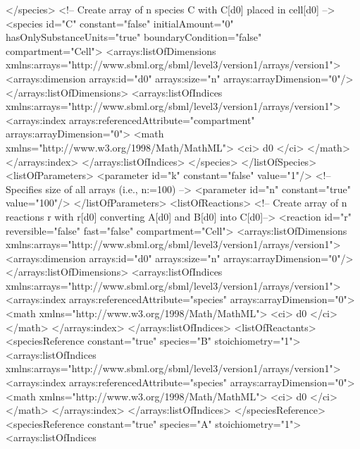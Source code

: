 \begin{example}
    </species>
    <!-- Create array of n species C with C[d0] placed in cell[d0] -->
    <species id="C" constant="false" initialAmount="0" hasOnlySubstanceUnits="true" 
	boundaryCondition="false" compartment="Cell">
        <arrays:listOfDimensions
            xmlns:arrays="http://www.sbml.org/sbml/level3/version1/arrays/version1">
            <arrays:dimension arrays:id="d0" arrays:size="n" arrays:arrayDimension="0"/>
        </arrays:listOfDimensions>
        <arrays:listOfIndices
            xmlns:arrays="http://www.sbml.org/sbml/level3/version1/arrays/version1">
            <arrays:index arrays:referencedAttribute="compartment" arrays:arrayDimension="0">
                <math xmlns="http://www.w3.org/1998/Math/MathML">
                    <ci> d0 </ci>
                </math>
            </arrays:index>
        </arrays:listOfIndices>
    </species>
</listOfSpecies>
<listOfParameters>
    <parameter id="k" constant="false" value="1"/>
    <!-- Specifies size of all arrays (i.e., n:=100) -->
    <parameter id="n" constant="true" value="100"/>
</listOfParameters>
<listOfReactions>
    <!-- Create array of n reactions r with r[d0] converting A[d0] and B[d0] into C[d0]-->
    <reaction id="r" reversible="false" fast="false" compartment="Cell">
        <arrays:listOfDimensions
            xmlns:arrays="http://www.sbml.org/sbml/level3/version1/arrays/version1">
            <arrays:dimension arrays:id="d0" arrays:size="n" arrays:arrayDimension="0"/>
        </arrays:listOfDimensions>
        <arrays:listOfIndices
            xmlns:arrays="http://www.sbml.org/sbml/level3/version1/arrays/version1">
            <arrays:index arrays:referencedAttribute="species" arrays:arrayDimension="0">
                <math xmlns="http://www.w3.org/1998/Math/MathML">
                    <ci> d0 </ci>
                </math>
            </arrays:index>
        </arrays:listOfIndices>
        <listOfReactants>
            <speciesReference constant="true" species="B" stoichiometry="1">
                <arrays:listOfIndices
                    xmlns:arrays="http://www.sbml.org/sbml/level3/version1/arrays/version1">
                    <arrays:index arrays:referencedAttribute="species" arrays:arrayDimension="0">
                        <math xmlns="http://www.w3.org/1998/Math/MathML">
                            <ci> d0 </ci>
                        </math>
                    </arrays:index>
                </arrays:listOfIndices>
            </speciesReference>
            <speciesReference constant="true" species="A" stoichiometry="1">
                <arrays:listOfIndices

\end{example}
